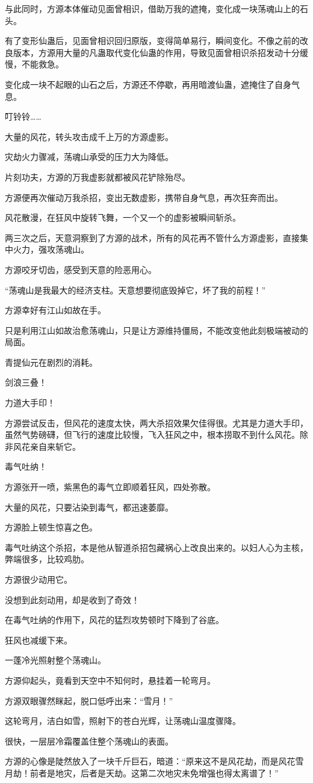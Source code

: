 \begin{this_body}
与此同时，方源本体催动见面曾相识，借助万我的遮掩，变化成一块荡魂山上的石头。

有了变形仙蛊后，见面曾相识回归原版，变得简单易行，瞬间变化。不像之前的改良版本，方源用大量的凡蛊取代变化仙蛊的作用，导致见面曾相识杀招发动十分缓慢，不能救急。

变化成一块不起眼的山石之后，方源还不停歇，再用暗渡仙蛊，遮掩住了自身气息。

叮铃铃……

大量的风花，转头攻击成千上万的方源虚影。

灾劫火力骤减，荡魂山承受的压力大为降低。

片刻功夫，方源的万我虚影就都被风花铲除殆尽。

方源便再次催动万我杀招，变出无数虚影，携带自身气息，再次狂奔而出。

风花散漫，在狂风中旋转飞舞，一个又一个的虚影被瞬间斩杀。

两三次之后，天意洞察到了方源的战术，所有的风花再不管什么方源虚影，直接集中火力，强攻荡魂山。

方源咬牙切齿，感受到天意的险恶用心。

“荡魂山是我最大的经济支柱。天意想要彻底毁掉它，坏了我的前程！”

方源幸好有江山如故在手。

只是利用江山如故治愈荡魂山，只是让方源维持僵局，不能改变他此刻极端被动的局面。

青提仙元在剧烈的消耗。

剑浪三叠！

力道大手印！

方源尝试反击，但风花的速度太快，两大杀招效果欠佳得很。尤其是力道大手印，虽然气势磅礴，但飞行的速度比较慢，飞入狂风之中，根本捞取不到什么风花。除非风花亲自来斩它。

毒气吐纳！

方源张开一喷，紫黑色的毒气立即顺着狂风，四处弥散。

大量的风花，只要沾染到毒气，都迅速萎靡。

方源脸上顿生惊喜之色。

毒气吐纳这个杀招，本是他从智道杀招包藏祸心上改良出来的。以妇人心为主核，弊端很多，比较鸡肋。

方源很少动用它。

没想到此刻动用，却是收到了奇效！

在毒气吐纳的作用下，风花的猛烈攻势顿时下降到了谷底。

狂风也减缓下来。

一蓬冷光照射整个荡魂山。

方源仰起头，竟看到天空中不知何时，悬挂着一轮弯月。

方源双眼骤然眯起，脱口低呼出来：“雪月！”

这轮弯月，洁白如雪，照射下的苍白光辉，让荡魂山温度骤降。

很快，一层层冷霜覆盖住整个荡魂山的表面。

方源的心像是陡然放入了一块千斤巨石，暗道：“原来这不是风花劫，而是风花雪月劫！前者是地灾，后者是天劫。这第二次地灾未免增强也得太离谱了！”

\end{this_body}

